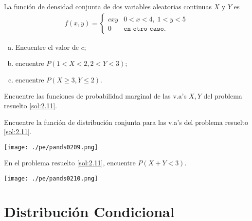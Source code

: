  \begin{exmp}
  \label{sol:2.11}
  La función de densidad conjunta de dos variables aleatorias continuas $X$ y $Y$ es
  \begin{align}
   f(x,y)=
   \begin{cases}
    cxy & 0<x<4, \; 1<y<5\\
    0 & \texttt{en otro caso}.
   \end{cases}
  \end{align}

 \end{exmp}
\begin{enumerate}[(a)]
 \item Encuentre el valor de $c$;
 \item encuentre $P(1<X<2,2<Y<3)$;
 \item encuentre $P(X\geq 3, Y\leq 2)$.
\end{enumerate}



 \begin{exmp}
  \label{sol:2.12}
  Encuentre las funciones de probabilidad marginal de las v.a's $X,Y$ del problema resuelto \ref{sol:2.11}.
 \end{exmp}



 \begin{exmp}
  \label{sol:2.13}
  Encuentre la función de distribución conjunta para las v.a's del problema resuelto \ref{sol:2.11}.
 \end{exmp}



 \begin{center}
 \texttt{[image: ./pe/pands0209.png]}
\end{center}




 \begin{exmp}
  \label{sol:2.14}
  En el problema resuelto \ref{sol:2.11}, encuentre $P(X+Y<3)$.
 \end{exmp}



 \begin{center}
 \texttt{[image: ./pe/pands0210.png]}
\end{center}



\section{Distribución Condicional}

